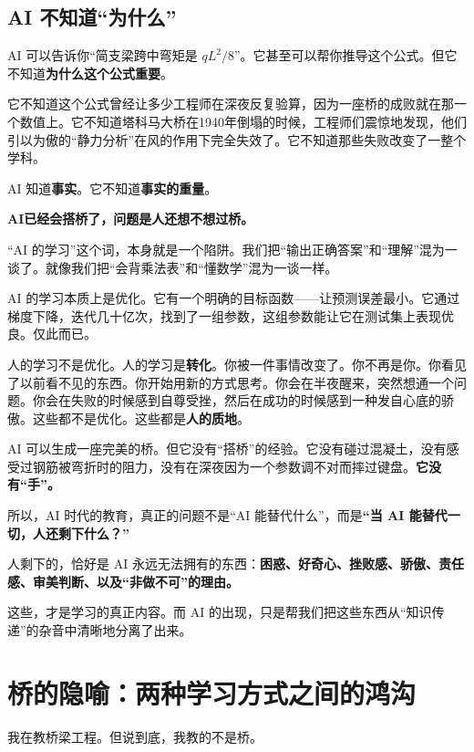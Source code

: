 \subsection{AI 不知道“为什么”}

AI 可以告诉你“简支梁跨中弯矩是 $qL^2/8$”。它甚至可以帮你推导这个公式。但它不知道\textbf{为什么这个公式重要}。

它不知道这个公式曾经让多少工程师在深夜反复验算，因为一座桥的成败就在那一个数值上。它不知道塔科马大桥在1940年倒塌的时候，工程师们震惊地发现，他们引以为傲的“静力分析”在风的作用下完全失效了。它不知道那些失败改变了一整个学科。

AI 知道\textbf{事实}。它不知道\textbf{事实的重量}。

\begin{shiyu-note}
\label{note:chap1-1}

\textbf{AI已经会搭桥了，问题是人还想不想过桥。}

“AI 的学习”这个词，本身就是一个陷阱。我们把“输出正确答案”和“理解”混为一谈了。就像我们把“会背乘法表”和“懂数学”混为一谈一样。

AI 的学习本质上是优化。它有一个明确的目标函数——让预测误差最小。它通过梯度下降，迭代几十亿次，找到了一组参数，这组参数能让它在测试集上表现优良。仅此而已。

人的学习不是优化。人的学习是\textbf{转化}。你被一件事情改变了。你不再是你。你看见了以前看不见的东西。你开始用新的方式思考。你会在半夜醒来，突然想通一个问题。你会在失败的时候感到自尊受挫，然后在成功的时候感到一种发自心底的骄傲。这些都不是优化。这些都是\textbf{人的质地}。

AI 可以生成一座完美的桥。但它没有“搭桥”的经验。它没有碰过混凝土，没有感受过钢筋被弯折时的阻力，没有在深夜因为一个参数调不对而摔过键盘。\textbf{它没有“手”。}

所以，AI 时代的教育，真正的问题不是“AI 能替代什么”，而是\textbf{“当 AI 能替代一切，人还剩下什么？”}

人剩下的，恰好是 AI 永远无法拥有的东西：\textbf{困惑、好奇心、挫败感、骄傲、责任感、审美判断、以及“非做不可”的理由。}

这些，才是学习的真正内容。而 AI 的出现，只是帮我们把这些东西从“知识传递”的杂音中清晰地分离了出来。
\end{shiyu-note}

\section{桥的隐喻：两种学习方式之间的鸿沟}

我在教桥梁工程。但说到底，我教的不是桥。


